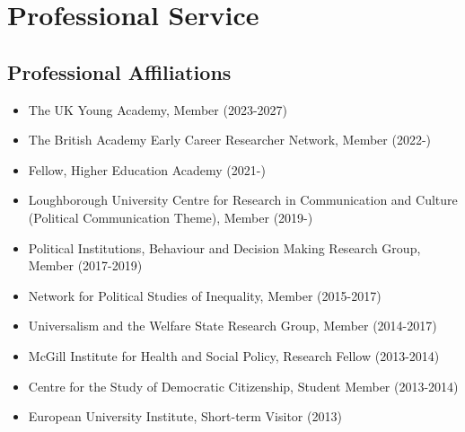 \documentclass[letterpaper,fontsize=10.5pt]{scrartcl}
\begin{document}
\section{Professional Service}
\subsection{Professional Affiliations}
\begin{itemize}[itemsep=0em, topsep=0em, partopsep=0em]
	\item The UK Young Academy, Member (2023-2027)
	\item The British Academy Early Career Researcher Network, Member (2022-)
	\item Fellow, Higher Education Academy (2021-)
	\item Loughborough University Centre for Research in Communication and Culture (Political Communication Theme), Member (2019-)
	\item Political Institutions, Behaviour and Decision Making Research Group, Member (2017-2019)
	\item Network for Political Studies of Inequality, Member (2015-2017)
	\item Universalism and the Welfare State Research Group, Member (2014-2017)
	\item McGill Institute for Health and Social Policy, Research Fellow (2013-2014)
	\item Centre for the Study of Democratic Citizenship, Student Member (2013-2014)
	\item European University Institute, Short-term Visitor (2013)
\end{itemize} 
\end{document}
